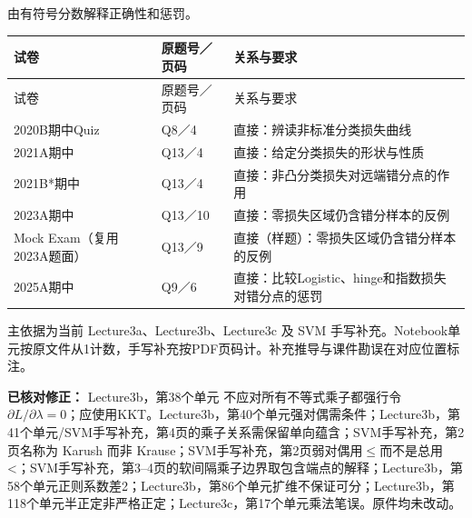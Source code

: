 

由有符号分数解释正确性和惩罚。

\begingroup\small\setlength{\tabcolsep}{3pt}\renewcommand{\arraystretch}{1.22}
\begin{longtable}{@{}>{\raggedright\arraybackslash}p{}>{\raggedright\arraybackslash}p{}>{\raggedright\arraybackslash}p{}@{}}
\toprule
试卷 & 原题号／页码 & 关系与要求 \\
\midrule\endfirsthead
试卷 & 原题号／页码 & 关系与要求 \\
\midrule\endhead
\bottomrule\endfoot
2020B期中Quiz & Q8／4 & 直接：辨读非标准分类损失曲线 \\
2021A期中 & Q13／4 & 直接：给定分类损失的形状与性质 \\
2021B*期中 & Q13／4 & 直接：非凸分类损失对远端错分点的作用 \\
2023A期中 & Q13／10 & 直接：零损失区域仍含错分样本的反例 \\
Mock Exam（复用2023A题面） & Q13／9 & 直接（样题）：零损失区域仍含错分样本的反例 \\
2025A期中 & Q9／6 & 直接：比较Logistic、hinge和指数损失对错分点的惩罚 \\
\end{longtable}\endgroup




主依据为当前 Lecture3a、Lecture3b、Lecture3c 及 SVM 手写补充。Notebook单元按原文件从1计数，手写补充按PDF页码计。补充推导与课件勘误在对应位置标注。


\textbf{已核对修正：} Lecture3b，第38个单元 不应对所有不等式乘子都强行令 \(\partial L/\partial\lambda=0\)；应使用KKT。Lecture3b，第40个单元强对偶需条件；Lecture3b，第41个单元/SVM手写补充，第4页的乘子关系需保留单向蕴含；SVM手写补充，第2页名称为 Karush 而非 Krause；SVM手写补充，第2页弱对偶用\ensuremath{\le}而不是总用<；SVM手写补充，第3–4页的软间隔乘子边界取包含端点的解释；Lecture3b，第58个单元正则系数差2；Lecture3b，第86个单元扩维不保证可分；Lecture3b，第118个单元半正定非严格正定；Lecture3c，第17个单元乘法笔误。原件均未改动。



